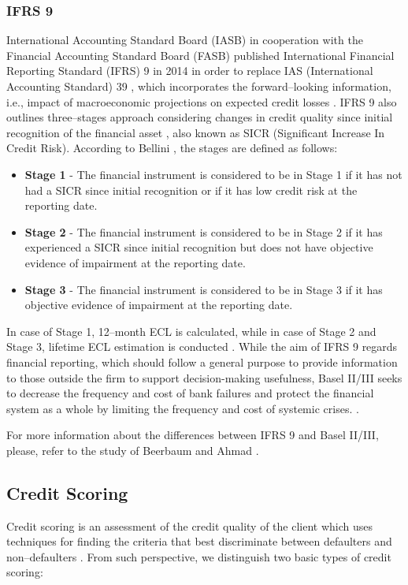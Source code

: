 \subsubsection{IFRS 9}
International Accounting  Standard Board (IASB) in cooperation with the Financial Accounting  Standard Board (FASB) published International Financial Reporting Standard (IFRS) 9 in 2014 in order to replace IAS (International Accounting Standard) 39 \citep{temim2016ifrs}, which incorporates the forward--looking information, i.e., impact of macroeconomic projections on expected credit losses \citep{porretta2020credit}.
IFRS 9 also outlines three--stages approach considering changes in credit quality since initial recognition of the financial asset \citep{beerbaum2015credit}, also known as SICR (Significant Increase In Credit Risk). According to Bellini \citep{bellini2019ifrs}, the stages are defined as follows:
\begin{itemize}\setlength\itemsep{0em}
    \item \textbf{Stage 1} - The financial instrument is considered to be in Stage 1 if it has not had a SICR since initial recognition or if it has low credit risk at the reporting date.
    \item \textbf{Stage 2} - The financial instrument is considered to be in Stage 2 if it has experienced a SICR since initial recognition but does not have objective evidence of impairment at the reporting date.
    \item \textbf{Stage 3} -  The financial instrument is considered to be in Stage 3 if it has objective evidence of impairment at the reporting date.
\end{itemize}
In case of Stage 1, 12--month ECL is calculated, while in case of Stage 2 and Stage 3, lifetime ECL estimation is conducted \citep{gornjak2017ifrs}.
While the aim of IFRS 9 regards financial reporting, which should follow a general purpose to provide information to those outside the firm to support decision-making usefulness, Basel II/III seeks to decrease the frequency and cost of bank failures and protect the financial system as a whole by limiting the frequency and cost of systemic crises. \citep{beerbaum2015credit}.

For more information about the differences between IFRS 9 and Basel II/III, please, refer to the study of Beerbaum and Ahmad \citep{beerbaum2015credit}.

\subsection{Credit Scoring}
Credit scoring is an assessment of the credit quality of the client which uses techniques for finding the criteria that best discriminate between defaulters and non--defaulters \citep{bessis2015}. From such perspective, we distinguish two basic types of credit scoring:

